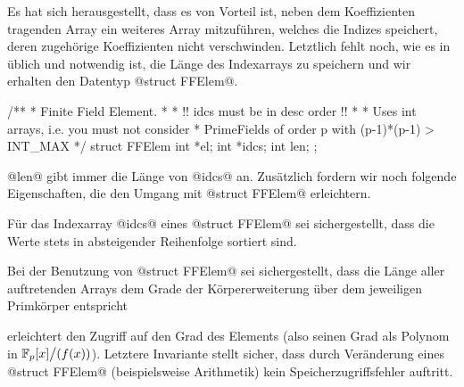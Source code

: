 Es hat sich herausgestellt, dass es von Vorteil ist, neben dem Koeffizienten
tragenden Array ein weiteres Array mitzuführen, welches die
Indizes speichert, deren zugehörige Koeffizienten nicht verschwinden. Letztlich
fehlt noch, wie es in \Clang üblich und notwendig ist, die Länge des
Indexarrays zu speichern und wir erhalten den Datentyp @struct FFElem@.

\begin{ccode}[caption={Aus \url{../Sage/enumeratePCNs.c}}]
/**
 * Finite Field Element. 
 * 
 * !! idcs must be in desc order !!
 *
 * Uses int arrays, i.e. you must not consider 
 * PrimeFields of order p with  (p-1)*(p-1) > INT_MAX
 */
struct FFElem{
    int *el;
    int *idcs;
    int len;
};
\end{ccode}

@len@ gibt immer die Länge von @idcs@ an. Zusätzlich fordern wir noch folgende
Eigenschaften, die den Umgang mit @struct FFElem@ erleichtern.

\begin{invariante}
  \label{invariante:desc_order}
  Für das Indexarray @idcs@ eines @struct FFElem@ sei sichergestellt, 
  dass die Werte stets in absteigender Reihenfolge sortiert sind. 
\end{invariante}

\begin{invariante}
  \label{invariante:array_len}
  Bei der Benutzung von @struct FFElem@ sei sichergestellt, 
  dass die Länge aller auftretenden Arrays dem Grade der 
  Körpererweiterung über dem jeweiligen Primkörper entspricht
\end{invariante}

 erleichtert den Zugriff auf
den Grad des Elements (also seinen Grad als Polynom in
$\mathbb{F}_p[x]\big/(f(x))$). Letztere Invariante stellt sicher, dass durch
Veränderung eines @struct FFElem@ (beispielsweise Arithmetik) kein 
Speicherzugriffsfehler auftritt.

